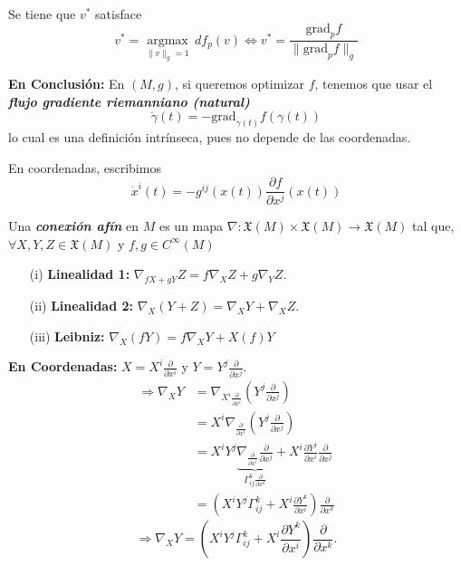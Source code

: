 \begin{theorem}
Se tiene que $v^*$ satisface
\begin{equation*}
    v^*=\underset{\|v\|_g=1}{\text{arg}\max}\,df_p(v)\iff v^*=\frac{\text{grad}_pf}{\|\text{grad}_pf\|_g}
\end{equation*}
\end{theorem}

\noindent\textbf{En Conclusi\'on:} En $(M,g)$, si queremos optimizar $f$, tenemos que usar el \textbf{\textit{flujo gradiente riemanniano (natural)}}
\begin{equation*}
    \dot{\gamma}(t)=-\text{grad}_{\gamma(t)}f(\gamma(t))
\end{equation*}
lo cual es una definici\'on intr\'inseca, pues no depende de las coordenadas. 

En coordenadas, escribimos
\begin{equation}
    \dot{x}^i(t)=-g^{ij}(x(t))\frac{\partial f}{\partial x^j}(x(t))
\end{equation}

\begin{definition}
Una \textbf{\textit{conexi\'on af\'in}} en $M$ es un mapa $\nabla\colon\mathfrak{X}(M)\times\mathfrak{X}(M)\to\mathfrak{X}(M)$ tal que, $\forall X,Y,Z\in\mathfrak{X}(M)$ y $f,g\in C^{\infty}(M)$
\begin{enumerate}
    \item[(i)]\textbf{Linealidad 1:} $\nabla_{fX+gY}Z=f\nabla_XZ+g\nabla_YZ$.
    \item[(ii)]\textbf{Linealidad 2:} $\nabla_X(Y+Z)=\nabla_XY+\nabla_XZ$.
    \item[(iii)]\textbf{Leibniz:} $\nabla_X(fY)=f\nabla_XY+X(f)Y$
\end{enumerate}
\end{definition}

\noindent\textbf{En Coordenadas:} $X=X^i\frac{\partial}{\partial x^i}$ y $Y=Y^j\frac{\partial}{\partial x^j}$.
\begin{align*}
    \Longrightarrow\nabla_XY&=\nabla_{X^i\frac{\partial}{\partial x^i}}\left(Y^j\frac{\partial}{\partial x^j}\right)\\
    &=X^i\nabla_{\frac{\partial}{\partial x^i}}\left(Y^j\frac{\partial}{\partial x^j}\right)\\
    &=X^iY^j\underbrace{\nabla_{\frac{\partial}{\partial x^i}}\frac{\partial}{\partial x^j}}_{\Gamma_{ij}^k\frac{\partial}{\partial x^k}}+X^i\frac{\partial Y^j}{\partial x^i}\frac{\partial}{\partial x^j}\\
    &=\left(X^iY^j\Gamma_{ij}^k+X^i\frac{\partial Y^k}{\partial x^i}\right)\frac{\partial}{\partial x^k}
\end{align*}
\begin{equation}
    \Longrightarrow\nabla_XY=\left(X^iY^j\Gamma_{ij}^k+X^i\frac{\partial Y^k}{\partial x^i}\right)\frac{\partial}{\partial x^k}.
\end{equation}


